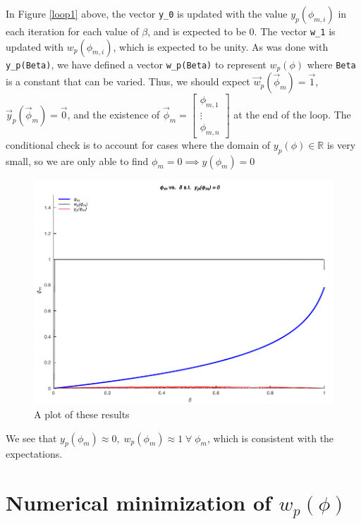 \documentclass[11pt]{article}
\begin{document}
In Figure \ref{loop1} above, the vector \verb|y_0| is updated with the value $y_p(\phi_{m,i})$ in each iteration
for each value of $\beta$, and is expected to be 0. The vector \verb|w_1| is updated with $w_p(\phi_{m,i})$, which is expected to be unity. As was done with \verb|y_p(Beta)|, 
we have defined a vector \verb|w_p(Beta)| to represent $w_p(\phi)$ where \verb|Beta| is a constant that can be varied.
Thus, we should expect $\vec w_p(\vec\phi_m)=\vec{1}$, $\vec y_p(\vec\phi_m)=\vec{0}$, and the existence of $\vec\phi_m=\begin{bmatrix}\phi_{m,1}\\\vdots\\\phi_{m,n}\end{bmatrix}$ at the end of the loop.
The conditional check is to account for cases where the domain of $y_p(\phi)\in \mathbb{R}$ is very small, so we are only able to find $\phi_m=0\implies y(\phi_m)=0$

\begin{figure}[H]
    \centering
    \includegraphics{plots/phi_delta_y.pdf}
    \caption{A plot of these results}\label{yminplot}
\end{figure}

We see that $y_p(\phi_m)\approx 0,\;w_p(\phi_m)\approx 1\;\forall\;\phi_m$, which is consistent with the expectations. 

\section{Numerical minimization of \texorpdfstring{$w_p(\phi)$}{}}
\end{document}
